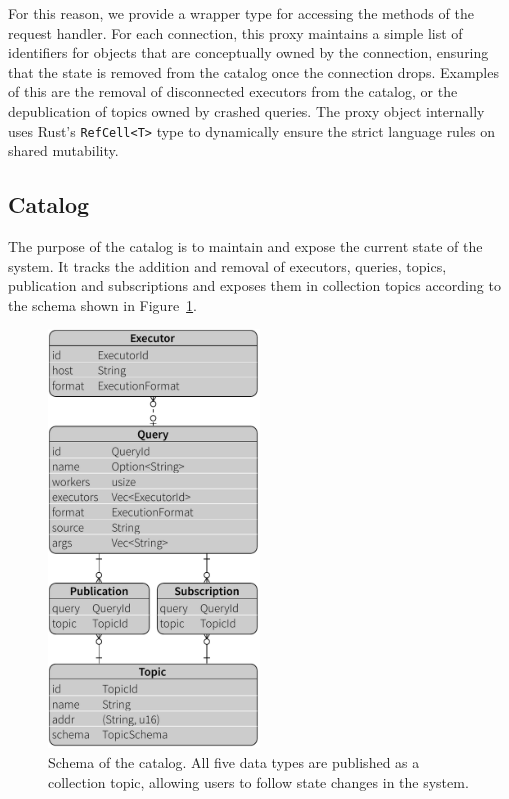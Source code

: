 For this reason, we provide a wrapper type for accessing the methods of the
request handler. For each connection, this proxy maintains a simple list of
identifiers for objects that are conceptually owned by the connection, ensuring that the state is
removed from the catalog once the connection drops. Examples of this are the removal
of disconnected executors from the catalog, or the depublication of topics
owned by crashed queries. The proxy object internally uses Rust's
\lstinline{RefCell<T>} type to dynamically ensure the strict language
rules on shared mutability.

\clearpage

\subsection{Catalog}

The purpose of the catalog is to maintain and expose the current state of the
system. It tracks the addition and removal of executors, queries, topics,
publication and subscriptions and exposes them in collection topics according
to the schema shown in Figure~\ref{fig:model}.

\begin{figure}[htb]
  \centering
    \includegraphics[width=0.5\textwidth]{figures/model}
  \caption[Schema of the catalog]{Schema of the catalog. All five data types
  are published as a collection topic, allowing users to follow state changes
  in the system.}
  \label{fig:model}
\end{figure}

